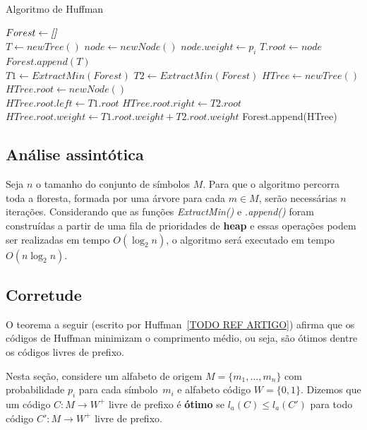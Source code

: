\begin{algorithm}[H]
\caption{Algoritmo de Huffman} \label{alg:huff}
\begin{algorithmic}
	\State $Forest \gets \emph{[]}$\\
	 
		\State $T \gets newTree()$
		\State $node \gets newNode()$
		\State $node.weight \gets p_i$ 
		\State $T.root \gets node$
		\State $Forest.append(T)$ 
	\EndFor \\
	
		\State $T1 \gets ExtractMin(Forest)$ 
		\State $T2 \gets ExtractMin(Forest)$
		\State $HTree \gets newTree()$
		\State $HTree.root \gets newNode()$ \\
		\State $HTree.root.left \gets T1.root$
		\State $HTree.root.right \gets T2.root$
		\State $HTree.root.weight \gets T1.root.weight + T2.root.weight$
		\State Forest.append(HTree) 
	\EndWhile
\end{algorithmic}
\end{algorithm}

\subsection{Análise assintótica}

Seja $n$ o tamanho do conjunto de símbolos $M$. Para que o algoritmo percorra toda a floresta, formada por uma árvore para cada $m \in M$, serão necessárias $n$ iterações. Considerando que as funções \emph{ExtractMin()} e \emph{.append()} foram construídas a partir de uma fila de prioridades de \textbf{heap} e essas operações podem ser realizadas em tempo $O(\log_2 n)$, o algoritmo será executado em tempo $O(n\log_2 n)$.

\subsection{Corretude}
O teorema a seguir (escrito por Huffman~\ref{TODO REF ARTIGO}) afirma
que os códigos de Huffman minimizam o comprimento médio, ou seja, são
ótimos dentre os códigos livres de prefixo.

Nesta seção, considere um alfabeto de origem $M = \{m_1,\dotsc, m_n\}$
com probabilidade $p_i$ para cada símbolo~$m_i$ e alfabeto código $W =
\{0,1\}$. Dizemos que um código $C: M\to W^+$ livre de prefixo é
\textbf{ótimo} se $l_a(C) \leq l_a(C')$ para todo código $C': M\to
W^+$ livre de prefixo.

